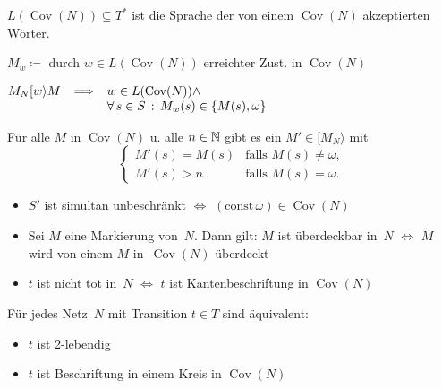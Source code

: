 \documentclass{cheat-sheet}
\newcommand{\activeTransition}[1]{[{#1}\rangle} %
\DeclareMathOperator{\Cov}{Cov} %
\begin{document}
\begin{defn}
  $L(\Cov(N)) \subseteq T^*$ ist die Sprache der von einem $\Cov(N)$ akzeptierten Wörter. 
\end{defn}

\begin{nota}
  $M_w \coloneqq $ durch $w \in L(\Cov(N))$ erreichter Zust. in $\Cov(N)$
\end{nota}

\begin{lem}
  $
    M_N \activeTransition{w} M \enspace \implies
    \begin{array}[t]{l}
      w \in L(\Cov(N)) \wedge \\
      \fa{s \in S} M_w(s) \in \{ M(s), \omega \}
    \end{array}
  $
\end{lem}

\begin{lem}
  Für alle $M$ in $\Cov(N)$ u. alle $n \in \mathbb{N}$ gibt es ein $M' \!\in\! \activeTransition{M_N}$ mit
  \[
    \begin{cases}
      M'(s) = M(s) & \text{falls } M(s) \neq \omega, \\
      M'(s) > n & \text{falls } M(s) = \omega.
    \end{cases}
  \]
\end{lem}

\begin{kor}
  \begin{itemize}
    \item $S'$ ist simultan unbeschränkt $\iff$ $(\mathrm{const} \, \omega) \in \Cov(N)$
    \item Sei $\tilde{M}$ eine Markierung von~$N$. Dann gilt: $\tilde{M}$ ist überdeckbar in~$N$ $\iff$ $\tilde{M}$ wird von einem $M$ in~$\Cov(N)$ überdeckt
    \item $t$ ist nicht tot in~$N$ $\iff$ $t$ ist Kantenbeschriftung in $\Cov(N)$
  \end{itemize}
\end{kor}

\begin{lem}
  Für jedes Netz~$N$ mit Transition $t \in T$ sind äquivalent:
  \begin{itemize}
    \item $t$ ist 2-lebendig
    \item $t$ ist Beschriftung in einem Kreis in $\Cov(N)$
  \end{itemize}
\end{lem}
\end{document}

